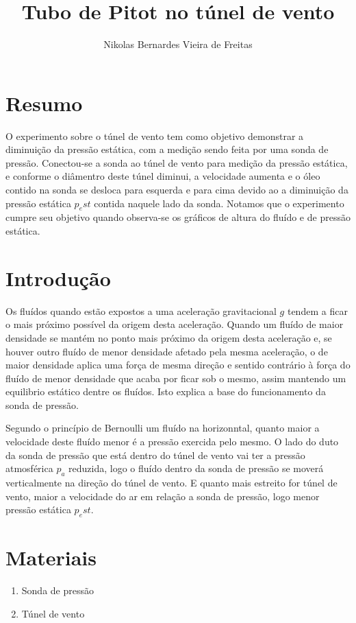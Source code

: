 \documentclass[a4paper]{article}
\title{Tubo de Pitot no túnel de vento}
\author{Nikolas Bernardes Vieira de Freitas}
\begin{document}
\maketitle

\section{Resumo}
    O experimento sobre o túnel de vento tem como objetivo demonstrar a diminuição da pressão estática, com a medição sendo feita por uma sonda de pressão. Conectou-se a sonda ao túnel de vento para medição da pressão estática, e conforme o diâmentro deste túnel diminui, a velocidade aumenta e o óleo contido na sonda se desloca para esquerda e para cima devido ao a diminuição da pressão estática $p_est$ contida naquele lado da sonda. Notamos que o experimento cumpre seu objetivo quando observa-se os gráficos de altura do fluído e de pressão estática.

\section{Introdução}
      Os fluídos quando estão expostos a uma aceleração gravitacional $g$ tendem a ficar o mais próximo possível da origem desta aceleração. Quando um fluído de maior densidade se mantém no ponto mais próximo da origem desta aceleração e, se houver outro fluído de menor densidade afetado pela mesma aceleração, o de maior densidade aplica uma força de mesma direção e sentido contrário à força do fluído de menor densidade que acaba por ficar sob o mesmo, assim mantendo um equilibrio estático dentre os fluídos. Isto explica a base do funcionamento da sonda de pressão.

     Segundo o princípio de Bernoulli um fluído na horizonntal, quanto maior a velocidade deste fluído menor é a pressão exercida pelo mesmo. O lado do duto da sonda de pressão que está dentro do túnel de vento vai ter a pressão atmosférica $p_a$ reduzida, logo o fluído dentro da sonda de pressão se moverá verticalmente na direção do túnel de vento. E quanto mais estreito for túnel de vento, maior a velocidade do ar em relação a sonda de pressão, logo menor pressão estática $p_est$.

\section{Materiais}
    \begin{enumerate}[label=(\roman*)]
        \item Sonda de pressão
        \item Túnel de vento
    \end{enumerate}
\end{document}
